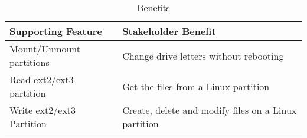 \begin{longtable}{|X|X|}
	\caption[]{\label{tab:visionBenefits} Benefits}\\
	\hline
	  \textbf{Supporting Feature} & 
	  \textbf{Stakeholder Benefit} \\
	\hline
	\hline
    Mount/Unmount partitions &
    Change drive letters without rebooting\\
	\hline
	  Read ext2/ext3 partition &
	  Get the files from a Linux partition \\
	\hline
    Write ext2/ext3 Partition &
    Create, delete and modify files on a Linux partition\\
	\hline
\end{longtable}

